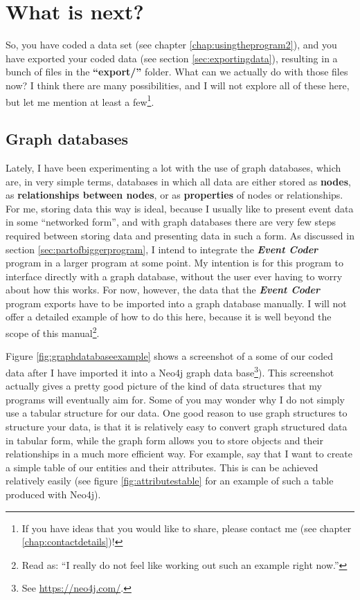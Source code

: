 \documentclass{memoir}
\begin{document}
\chapter{What is next?}
\label{chap:whatisnext}

So, you have coded a data set (see chapter \ref{chap:usingtheprogram2}), and you have exported your coded data (see section \ref{sec:exportingdata}), resulting in a bunch of files in the \textbf{``export/''} folder. What can we actually do with those files now? I think there are many possibilities, and I will not explore all of these here, but let me mention at least a few\footnote{If you have ideas that you would like to share, please contact me (see chapter \ref{chap:contactdetails})!}.

\section{Graph databases}
\label{sec:graphdatasets}

Lately, I have been experimenting a lot with the use of graph databases, which are, in very simple terms, databases in which all data are either stored as \textbf{nodes}, as \textbf{relationships between nodes}, or as \textbf{properties} of nodes or relationships. For me, storing data this way is ideal, because I usually like to present event data in some ``networked form'', and with graph databases there are very few steps required between storing data and presenting data in such a form. As discussed in section \ref{sec:partofbiggerprogram}, I intend to integrate the \textbf{\emph{Event Coder}} program in a larger program at some point. My intention is for this program to interface directly with a graph database, without the user ever having to worry about how this works. For now, however, the data that the \textbf{\emph{Event Coder}} program exports have to be imported into a graph database manually. I will not offer a detailed example of how to do this here, because it is well beyond the scope of this manual\footnote{Read as: ``I really do not feel like working out such an example right now.''}.

Figure \ref{fig:graphdatabaseexample} shows a screenshot of a some of our coded data after I have imported it into a Neo4j graph data base\footnote{See \url{https://neo4j.com/}.}). This screenshot actually gives a pretty good picture of the kind of data structures that my programs will eventually aim for. Some of you may wonder why I do not simply use a tabular structure for our data. One good reason to use graph structures to structure your data, is that it is relatively easy to convert graph structured data in tabular form, while the graph form allows you to store objects and their relationships in a much more efficient way. For example, say that I want to create a simple table of our entities and their attributes. This is can be achieved relatively easily (see figure \ref{fig:attributestable} for an example of such a table produced with Neo4j).
\end{document}
